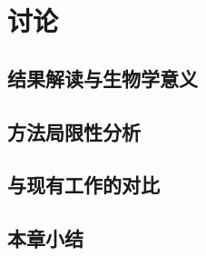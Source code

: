 \chapter{讨论}
\label{ch:discussion}

\section{结果解读与生物学意义}
\label{sec:interpretation}

\section{方法局限性分析}
\label{sec:limitations}

\section{与现有工作的对比}
\label{sec:comparison}

\section{本章小结}
\label{sec:ch5-summary}
